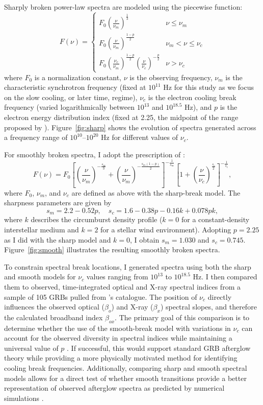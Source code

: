 \documentclass{article}
\begin{document}
Sharply broken power-law spectra are modeled using the piecewise function:
\[
F(\nu) = 
     \begin{cases} 
      F_0 \left(\frac{\nu}{\nu_m}\right)^{\frac{1}{3}} & \nu \leq \nu_m \\
      F_0 \left(\frac{\nu}{\nu_m}\right)^{\frac{1-p}{2}} & \nu_m < \nu \leq \nu_c \\
      F_0 \left(\frac{\nu_c}{\nu_m}\right)^{\frac{1-p}{2}} \left(\frac{\nu}{\nu_c}\right)^{-\frac{p}{2}} & \nu > \nu_c 
    \end{cases}
\]
where $F_0$ is a normalization constant, $\nu$ is the observing frequency, $\nu_m$ is the characteristic synchrotron frequency (fixed at $10^{11}$ Hz for this study as we focus on the slow cooling, or later time, regime), $\nu_c$ is the electron cooling break frequency (varied logarithmically between $10^{13}$ and $10^{18.5}$ Hz), and $p$ is the electron energy distribution index (fixed at 2.25, the midpoint of the range proposed by \cite{pvalues}). Figure~\ref{fig:sharp} shows the evolution of spectra generated across a frequency range of $10^{10}$--$10^{20}$ Hz for different values of $\nu_c$.

For smoothly broken spectra, I adopt the prescription of \cite{breaks}:
\[
F(\nu) = F_0 \left[\left(\frac{\nu}{\nu_m}\right)^{-\frac{s_m}{3}} + \left(\frac{\nu}{\nu_m}\right)^{-\frac{s_m(1-p)}{2}}\right]^{-\frac{1}{s_m}} \left[1 + \left(\frac{\nu}{\nu_c}\right)^{\frac{s_c}{2}}\right]^{-\frac{1}{s_c}},
\]
where $F_0$, $\nu_m$, and $\nu_c$ are defined as above with the sharp-break model. The sharpness parameters are given by
\[
s_m = 2.2 - 0.52p, \quad
s_c = 1.6 - 0.38p - 0.16k + 0.078pk,
\]
where $k$ describes the circumburst density profile ($k=0$ for a constant-density interstellar medium and $k=2$ for a stellar wind environment). Adopting $p = 2.25$ as I did with the sharp model and $k = 0$, I obtain $s_m = 1.030$ and $s_c = 0.745$. Figure~\ref{fig:smooth} illustrates the resulting smoothly broken spectra.

To constrain spectral break locations, I generated spectra using both the sharp and smooth models for $\nu_c$ values ranging from $10^{13}$ to $10^{18.5}$ Hz. I then compared them to observed, time-integrated optical and X-ray spectral indices from a sample of 105 GRBs pulled from \cite{grb_sample}'s catalogue. The position of $\nu_c$ directly influences the observed optical ($\beta_o$) and X-ray ($\beta_x$) spectral slopes, and therefore the calculated broadband index $\beta_{ox}$. The primary goal of this comparison is to determine whether the use of the smooth-break model with variations in $\nu_c$ can account for the observed diversity in spectral indices while maintaining a universal value of $p$ \parencite{granot_smooth}. If successful, this would support standard GRB afterglow theory while providing a more physically motivated method for identifying cooling break frequencies. Additionally, comparing sharp and smooth spectral models allows for a direct test of whether smooth transitions provide a better representation of observed afterglow spectra as predicted by numerical simulations \parencite{breaks}.
\end{document}
